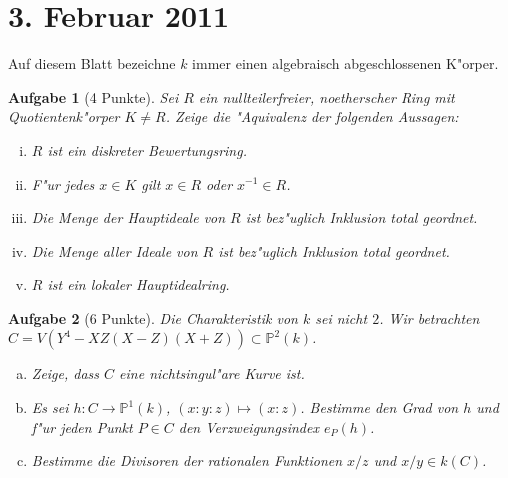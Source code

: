 \documentclass[a4paper, 12pt, numbers=noendperiod, chapterprefix=true, headsepline]{scrbook}
\theoremstyle{break}
\newtheorem{Aufg}{Aufgabe}
\theoremstyle{nonumberbreak}
\theoremstyle{nonumberplain}
\newcommand{\IP}{\mathbb{P}}%
\begin{document}
\newpage
\section{3. Februar 2011}
\setcounter{Aufg}{0}
\setcounter{Loes}{2}

Auf diesem Blatt bezeichne $k$ immer einen algebraisch abgeschlossenen K"orper.

\begin{Aufg}[4 Punkte]
Sei $R$ ein nullteilerfreier, noetherscher Ring mit Quotientenk"orper $K \ne R$. Zeige die "Aquivalenz der folgenden Aussagen:
\begin{enumerate}[i)]
	\item $R$ ist ein diskreter Bewertungsring.
	\item F"ur jedes $x \in K$ gilt $x \in R$ oder $x^{-1} \in R$.
	\item Die Menge der Hauptideale von $R$ ist bez"uglich Inklusion total geordnet.
	\item Die Menge aller Ideale von $R$ ist bez"uglich Inklusion total geordnet.
	\item $R$ ist ein lokaler Hauptidealring.
\end{enumerate}\end{Aufg}

\begin{Aufg}[6 Punkte]
Die Charakteristik von $k$ sei nicht $2$. Wir betrachten $C = V(Y^4 - XZ(X-Z)(X+Z))\subset \IP^2(k)$.
\begin{enumerate}[a)]
	\item Zeige, dass $C$ eine nichtsingul"are Kurve ist.
	\item Es sei $h:C\to \IP^1(k)$, $(x:y:z) \mapsto (x:z)$. Bestimme den Grad von $h$ und f"ur jeden Punkt $P\in C$ den Verzweigungsindex $e_P(h)$.
	\item Bestimme die Divisoren der rationalen Funktionen $x/z$ und $x/y\in k(C)$.
\end{enumerate}\end{Aufg}
\end{document}
